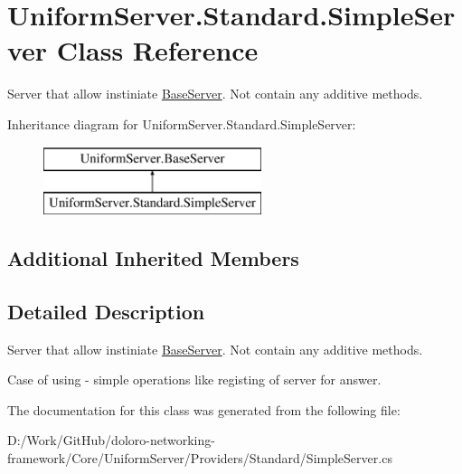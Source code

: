 \hypertarget{class_uniform_server_1_1_standard_1_1_simple_server}{}\section{Uniform\+Server.\+Standard.\+Simple\+Server Class Reference}
\label{class_uniform_server_1_1_standard_1_1_simple_server}


Server that allow instiniate \mbox{\hyperlink{class_uniform_server_1_1_base_server}{Base\+Server}}. Not contain any additive methods.  


Inheritance diagram for Uniform\+Server.\+Standard.\+Simple\+Server\+:\begin{figure}[H]
\begin{center}
\leavevmode
\includegraphics[height=2.000000cm]{db/daa/class_uniform_server_1_1_standard_1_1_simple_server}
\end{center}
\end{figure}
\subsection*{Additional Inherited Members}


\subsection{Detailed Description}
Server that allow instiniate \mbox{\hyperlink{class_uniform_server_1_1_base_server}{Base\+Server}}. Not contain any additive methods. 

Case of using -\/ simple operations like registing of server for answer. 

The documentation for this class was generated from the following file\+:\begin{DoxyCompactItemize}
\item 
D\+:/\+Work/\+Git\+Hub/doloro-\/networking-\/framework/\+Core/\+Uniform\+Server/\+Providers/\+Standard/Simple\+Server.\+cs\end{DoxyCompactItemize}
